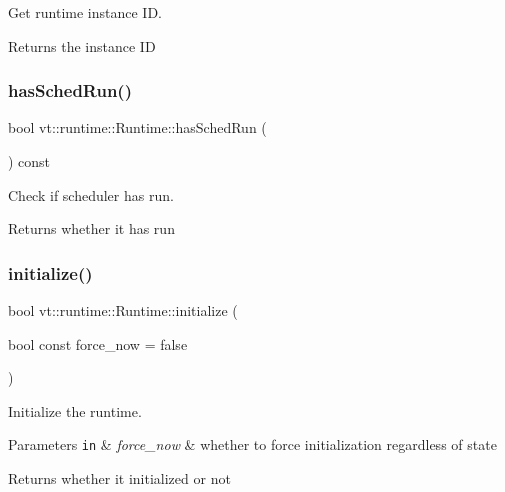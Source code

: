 Get runtime instance ID. 

\begin{DoxyReturn}{Returns}
the instance ID 
\end{DoxyReturn}
\mbox{\label{structvt_1_1runtime_1_1_runtime_ae0f66c530a72122874079b52fb259dfb}} 
\subsubsection{\texorpdfstring{has\+Sched\+Run()}{hasSchedRun()}}
{\footnotesize\ttfamily bool vt\+::runtime\+::\+Runtime\+::has\+Sched\+Run (\begin{DoxyParamCaption}{ }\end{DoxyParamCaption}) const}



Check if scheduler has run. 

\begin{DoxyReturn}{Returns}
whether it has run 
\end{DoxyReturn}
\mbox{\label{structvt_1_1runtime_1_1_runtime_a7590edf43fad3a219ef9335a97f4aebb}} 
\subsubsection{\texorpdfstring{initialize()}{initialize()}}
{\footnotesize\ttfamily bool vt\+::runtime\+::\+Runtime\+::initialize (\begin{DoxyParamCaption}\item[{bool const}]{force\+\_\+now = {\ttfamily false} }\end{DoxyParamCaption})}



Initialize the runtime. 


\begin{DoxyParams}[1]{Parameters}
\mbox{\tt in}  & {\em force\+\_\+now} & whether to force initialization regardless of state\\
\hline
\end{DoxyParams}
\begin{DoxyReturn}{Returns}
whether it initialized or not 
\end{DoxyReturn}
\mbox{\label{structvt_1_1runtime_1_1_runtime_a798be8c8813889ef0aacdbc8668d8a41}} 
